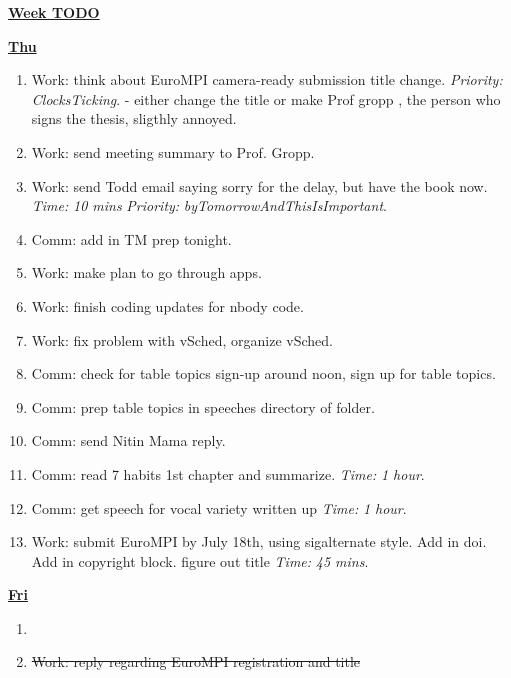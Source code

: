 \documentclass[serif,mathserif,final]{beamer}
\newcommand{\doneTask}[1]{\item \sout{#1}}
\newcommand{\timeEst}[1]{\textit{Time:} \textit{#1}}
\newcommand{\priority}[1]{\textit{Priority:} \textit{#1}}
\begin{document}
\begin{frame}{}
\begin{columns}[t]
\begin{column}{0.33\linewidth}{\textbf{\underline{Week TODO}}}
\begin{block}
\begin{enumerate}
\end{enumerate} 

\textbf{\underline{Thu}}
\begin{enumerate} 
\tiny \item \tiny Work: think about EuroMPI camera-ready submission title
  change. \priority{ClocksTicking}. - either change the title or make Prof gropp , the person who signs the thesis, sligthly annoyed. 

\item \tiny Work: send meeting summary to Prof. Gropp.

\item \tiny Work: send Todd email saying sorry for the delay, but have
  the book now. \timeEst{10 mins} \priority{byTomorrowAndThisIsImportant}. 


\item \tiny Comm: add in TM prep tonight. 


\item \tiny Work: make plan to go through apps. 

\item \tiny Work: finish coding updates for nbody code. 

\item \tiny Work: fix problem with vSched, organize vSched. 

\item \tiny Comm: check for table topics sign-up around noon, sign up for table topics. 
\item \tiny Comm: prep table topics in speeches directory of folder. 
\item \tiny Comm: send Nitin Mama reply. 

\item \tiny Comm: read 7 habits 1st chapter and summarize. \timeEst{1 hour}.

\item \tiny Comm: get speech for vocal variety written up \timeEst{1 hour}. 

\item \tiny Work: submit EuroMPI by July 18th, using sigalternate style. Add in doi. Add in copyright block. figure out title \timeEst{45 mins}. 

\end{enumerate} 


\textbf{\underline{Fri}} 
\begin{enumerate} 
\item \tiny \doneTask{ Work: reply regarding EuroMPI registration and title }


\end{enumerate}
\end{block}
\end{column}
\end{columns}
\end{frame}
\end{document}
